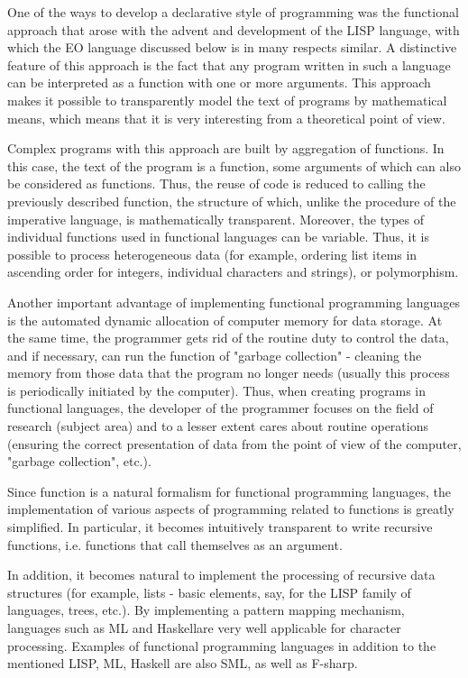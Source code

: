 \documentclass[12pt]{book}
\begin{document}
One of the ways to develop a declarative style of programming was the functional approach that arose with the advent and development of the LISP language, with which the EO language discussed below is in many respects similar. A distinctive feature of this approach is the fact that any program written in such a language can be interpreted as a function with one or more arguments. This approach makes it possible to transparently model the text of programs by mathematical means, which means that it is very interesting from a theoretical point of view. 

Complex programs with this approach are built by aggregation of functions. In this case, the text of the program is a function, some arguments of which can also be considered as functions. Thus, the reuse of code is reduced to calling the previously described function, the structure of which, unlike the procedure of the imperative language, is mathematically transparent. Moreover, the types of individual functions used in functional languages can be variable. Thus, it is possible to process heterogeneous data (for example, ordering list items in ascending order for integers, individual characters and strings), or polymorphism.

Another important advantage of implementing functional programming languages is the automated dynamic allocation of computer memory for data storage. At the same time, the programmer gets rid of the routine duty to control the data, and if necessary, can run the function of "garbage collection" - cleaning the memory from those data that the program no longer needs (usually this process is periodically initiated by the computer). Thus, when creating programs in functional languages, the developer of the programmer focuses on the field of research (subject area) and to a lesser extent cares about routine operations (ensuring the correct presentation of data from the point of view of the computer, "garbage collection", etc.).

Since function is a natural formalism for functional programming languages, the implementation of various aspects of programming related to functions is greatly simplified. In particular, it becomes intuitively transparent to write recursive functions, i.e.  functions that call themselves as an argument. 

In addition, it becomes natural to implement the processing of recursive data structures (for example, lists - basic elements, say, for the LISP family of languages, trees, etc.). By implementing a pattern mapping mechanism, languages such as ML and Haskellare very well applicable for character processing. Examples of functional programming languages in addition to the mentioned LISP, ML, Haskell  are also SML, as well as F-sharp.
\end{document}
